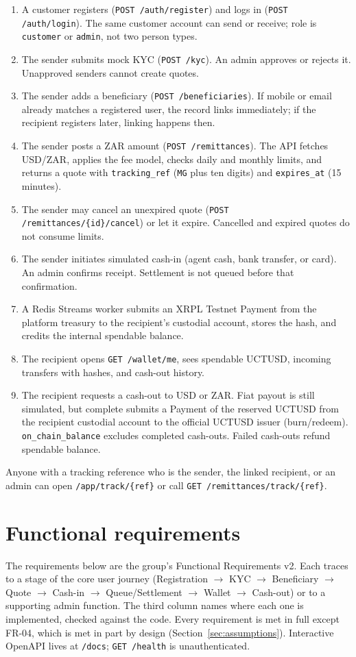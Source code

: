 \documentclass[11pt]{article}
\begin{document}
\begin{enumerate}
  \item A customer registers (\texttt{POST /auth/register}) and logs in (\texttt{POST /auth/login}). The same customer account can send or receive; role is \texttt{customer} or \texttt{admin}, not two person types.
  \item The sender submits mock KYC (\texttt{POST /kyc}). An admin approves or rejects it. Unapproved senders cannot create quotes.
  \item The sender adds a beneficiary (\texttt{POST /beneficiaries}). If mobile or email already matches a registered user, the record links immediately; if the recipient registers later, linking happens then.
  \item The sender posts a ZAR amount (\texttt{POST /remittances}). The API fetches USD/ZAR, applies the fee model, checks daily and monthly limits, and returns a quote with \texttt{tracking\_ref} (\texttt{MG} plus ten digits) and \texttt{expires\_at} (15 minutes).
  \item The sender may cancel an unexpired quote (\texttt{POST /remittances/\{id\}/cancel}) or let it expire. Cancelled and expired quotes do not consume limits.
  \item The sender initiates simulated cash-in (agent cash, bank transfer, or card). An admin confirms receipt. Settlement is not queued before that confirmation.
  \item A Redis Streams worker submits an XRPL Testnet Payment from the platform treasury to the recipient's custodial account, stores the hash, and credits the internal spendable balance.
  \item The recipient opens \texttt{GET /wallet/me}, sees spendable UCTUSD, incoming transfers with hashes, and cash-out history.
  \item The recipient requests a cash-out to USD or ZAR. Fiat payout is still simulated, but complete submits a Payment of the reserved UCTUSD from the recipient custodial account to the official UCTUSD issuer (burn/redeem). \texttt{on\_chain\_balance} excludes completed cash-outs. Failed cash-outs refund spendable balance.
\end{enumerate}

Anyone with a tracking reference who is the sender, the linked recipient, or an admin can open \texttt{/app/track/\{ref\}} or call \texttt{GET /remittances/track/\{ref\}}.

\section{Functional requirements}
\label{sec:fr}
The requirements below are the group's Functional Requirements v2. Each traces to a stage of the core user journey (Registration $\to$ KYC $\to$ Beneficiary $\to$ Quote $\to$ Cash-in $\to$ Queue/Settlement $\to$ Wallet $\to$ Cash-out) or to a supporting admin function. The third column names where each one is implemented, checked against the code. Every requirement is met in full except FR-04, which is met in part by design (Section~\ref{sec:assumptions}). Interactive OpenAPI lives at \texttt{/docs}; \texttt{GET /health} is unauthenticated.
\end{document}
